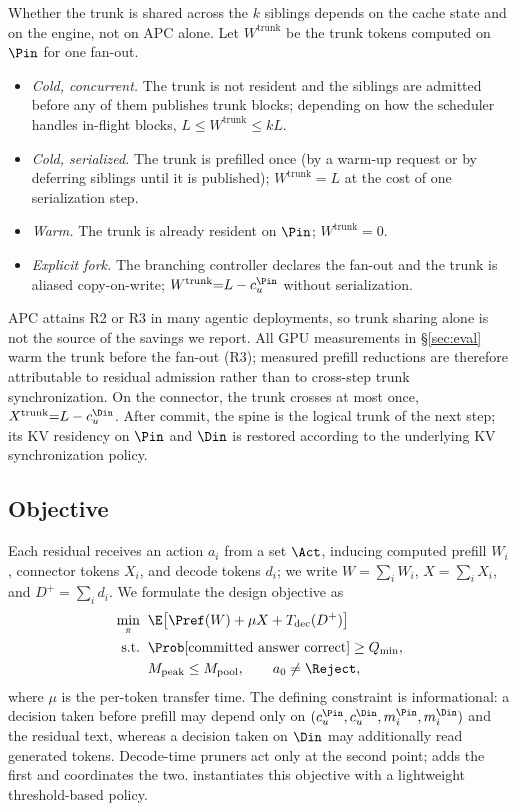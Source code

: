 Whether the trunk is shared across the $k$ siblings depends on the cache state and on the engine, not on APC alone.
Let $W^{\mathrm{trunk}}$ be the trunk tokens computed on $\Pin$ for one fan-out.
\begin{itemize}[leftmargin=*,itemsep=1pt,topsep=2pt]
\item[\textbf{R1}] \emph{Cold, concurrent.} The trunk is not resident and the siblings are admitted before any of them publishes trunk blocks; depending on how the scheduler handles in-flight blocks, $L\le W^{\mathrm{trunk}}\le kL$.
\item[\textbf{R2}] \emph{Cold, serialized.} The trunk is prefilled once (by a warm-up request or by deferring siblings until it is published); $W^{\mathrm{trunk}}{=}L$ at the cost of one serialization step.
\item[\textbf{R3}] \emph{Warm.} The trunk is already resident on $\Pin$; $W^{\mathrm{trunk}}{=}0$.
\item[\textbf{R4}] \emph{Explicit fork.} The branching controller declares the fan-out and the trunk is aliased copy-on-write; $W^{\mathrm{trunk}}{=}L-c_u^{\Pin}$ without serialization.
\end{itemize}
APC attains R2 or R3 in many agentic deployments, so trunk sharing alone is not the source of the savings we report.
All GPU measurements in \S\ref{sec:eval} warm the trunk before the fan-out (R3); measured prefill reductions are therefore attributable to residual admission rather than to cross-step trunk synchronization.
On the connector, the trunk crosses at most once, $X^{\mathrm{trunk}}{=}L-c_u^{\Din}$.
After commit, the spine is the logical trunk of the next step; its KV residency on $\Pin$ and $\Din$ is restored according to the underlying KV synchronization policy.

\subsection{Objective}
\label{sec:objective}

Each residual receives an action $a_i$ from a set $\Act$, inducing computed prefill $W_i$, connector tokens $X_i$, and decode tokens $d_i$; we write $W{=}\sum_iW_i$, $X{=}\sum_iX_i$, and $D^{+}{=}\sum_id_i$.
We formulate the design objective as
\begin{equation}
\label{eq:objective}
\begin{aligned}
\min_{\pi}\;\; & \E\bigl[\Pref(W)+\mu X+T_{\mathrm{dec}}(D^{+})\bigr]\\
\text{s.t.}\;\; & \Prob[\text{committed answer correct}]\ge Q_{\min},\\
& M_{\mathrm{peak}}\le M_{\mathrm{pool}},\qquad a_0\neq\Reject,
\end{aligned}
\end{equation}
where $\mu$ is the per-token transfer time.
The defining constraint is informational: a decision taken before prefill may depend only on $(c_u^{\Pin},c_u^{\Din},m_i^{\Pin},m_i^{\Din})$ and the residual text, whereas a decision taken on $\Din$ may additionally read generated tokens.
Decode-time pruners act only at the second point; \sys adds the first and coordinates the two.
\sys instantiates this objective with a lightweight threshold-based policy.
